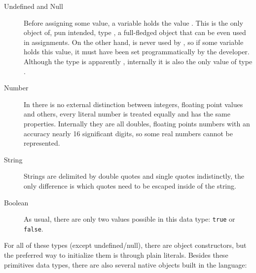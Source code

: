 \begin{description}
  \item[Undefined and Null] Before assigning some value, a variable holds the value .
  This  is the only object of, pun intended, type , a full-fledged object that can be even used in assignments.
  On the other hand,  is never used by , so if some variable holds this value, it must have been set programmatically by the developer.
  Although the type  is apparently , internally it is also the only value of type .
  \item[Number] In  there is no external distinction between integers, floating point values and others, every literal number is treated equally and has the same properties.
  Internally they are all doubles, floating points numbers with an accuracy nearly 16 significant digits, so some real numbers cannot be represented.
  \item[String] Strings are delimited by double quotes and single quotes indistinctly, the only difference is which quotes need to be escaped inside of the string.
  \item[Boolean] As usual, there are only two values possible in this data type: \texttt{true} or \texttt{false}.
\end{description}

For all of these types (except undefined/null), there are object constructors, but the preferred way to initialize them is through plain literals.
Besides these primitives data types, there are also several native objects built in the language:

